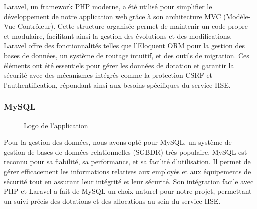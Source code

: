 \documentclass[a4paper,12pt]{report}
\begin{document}
Laravel, un framework PHP moderne, a été utilisé pour simplifier le développement de notre application web grâce à son architecture MVC (Modèle-Vue-Contrôleur). Cette structure organisée permet de maintenir un code propre et modulaire, facilitant ainsi la gestion des évolutions et des modifications. Laravel offre des fonctionnalités telles que l'Eloquent ORM pour la gestion des bases de données, un système de routage intuitif, et des outils de migration. Ces éléments ont été essentiels pour gérer les données de dotation et garantir la sécurité avec des mécanismes intégrés comme la protection CSRF et l’authentification, répondant ainsi aux besoins spécifiques du service HSE.

\subsubsection{MySQL}
\begin{figure}[H]
    \centering
    \caption{Logo de l'application}
\end{figure}

Pour la gestion des données, nous avons opté pour MySQL, un système de gestion de bases de données relationnelles (SGBDR) très populaire. MySQL est reconnu pour sa fiabilité, sa performance, et sa facilité d'utilisation. Il permet de gérer efficacement les informations relatives aux employés et aux équipements de sécurité tout en assurant leur intégrité et leur sécurité. Son intégration facile avec PHP et Laravel a fait de MySQL un choix naturel pour notre projet, permettant un suivi précis des dotations et des allocations au sein du service HSE.
\end{document}
